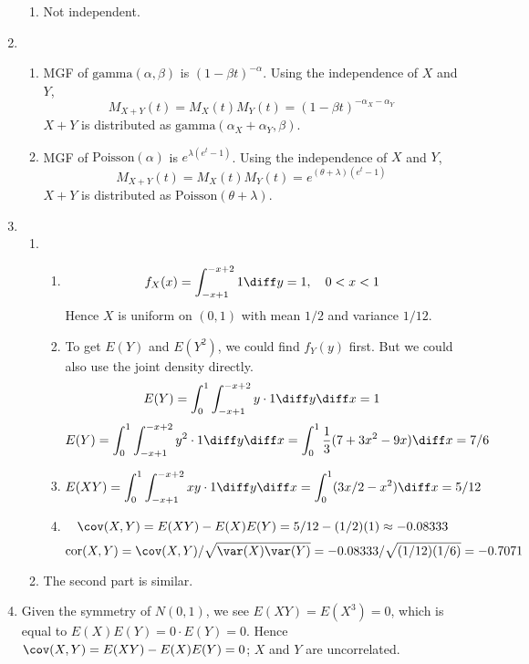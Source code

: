 \documentclass[12pt]{article}
\begin{document}
\begin{enumerate}
\begin{enumerate}
\item
Not independent.
\end{enumerate}

\item
\begin{enumerate}
\item MGF of $\text{gamma}(\alpha,\beta)$ is $(1- \beta t)^{-\alpha}$.
Using the independence of $X$ and $Y$,
\[
M_{X+Y}(t)
= M_X(t) M_Y(t)
= (1 - \beta t)^{-\alpha_X - \alpha_Y}
\]
$X+Y$ is distributed as $\text{gamma}(\alpha_X+\alpha_Y, \beta)$.

\item
MGF of $\text{Poisson}(\alpha)$ is $e^{\lambda(e^t - 1)}$.
Using the independence of $X$ and $Y$,
\[
M_{X+Y}(t)
= M_X(t) M_Y(t)
= e^{(\theta+\lambda)(e^t - 1)}
\]
$X+Y$ is distributed as $\text{Poisson}(\theta+\lambda)$.
\end{enumerate}

\item

\begin{enumerate}
\item

\begin{enumerate}
\item
\[
f_X(x) = \int_{-x+1}^{-x+2} 1 \diff y = 1,
\quad 0<x<1
\]
Hence $X$ is uniform on $(0,1)$ with mean $1/2$ and variance $1/12$.

\item
To get $E(Y)$ and $E(Y^2)$, we could find $f_Y(y)$ first.
But we could also use the joint density directly.
\[
E(Y) = \int_0^1 \int_{-x+1}^{-x+2} y\cdot 1 \diff y\diff x = 1
\]
\[
E(Y) = \int_0^1 \int_{-x+1}^{-x+2} y^2\cdot 1 \diff y\diff x
    = \int_0^1 \frac{1}{3}(7 + 3x^2 - 9x) \diff x = 7/6
\]
\item
\[
E(XY) = \int_0^1 \int_{-x+1}^{-x+2} xy\cdot 1 \diff y\diff x
= \int_0^1 (3x/2 - x^2) \diff x
= 5/12
\]
\item
\[
\cov(X,Y)
= E(XY) - E(X)E(Y)
= 5/12 - (1/2)(1)
\approx -0.08333
\]
\[
\operatorname{cor}(X,Y)
= \cov(X,Y) / \sqrt{\var(X)\var(Y)}
= -0.08333/\sqrt{(1/12) (1/6)}
= -0.7071
\]
\end{enumerate}

\item
The second part is similar.
\end{enumerate}

\item

Given the symmetry of $N(0,1)$,
we see $E(XY) = E(X^3) = 0$, which is equal to
$E(X)E(Y) = 0\cdot E(Y) = 0$.
Hence
$\cov(X,Y) = E(XY) - E(X)E(Y) = 0$;
$X$ and $Y$ are uncorrelated.


\end{enumerate}
\end{document}
